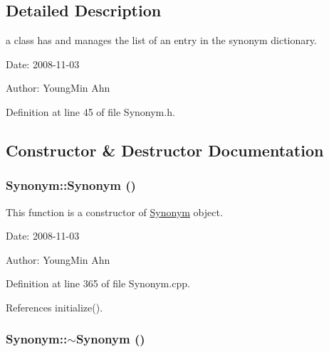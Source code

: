 \subsection{Detailed Description}
a class has and manages the list of an entry in the synonym dictionary. 

\begin{Desc}
\item[Date:]2008-11-03 \end{Desc}
\begin{Desc}
\item[Author:]YoungMin Ahn \end{Desc}


Definition at line 45 of file Synonym.h.

\subsection{Constructor \& Destructor Documentation}
\hypertarget{classkmaOrange_1_1Synonym_15f7de0140cea25ad188b3bc8e1dd093}{
\subsubsection[{Synonym}]{\setlength{\rightskip}{0pt plus 5cm}Synonym::Synonym ()}}
\label{classkmaOrange_1_1Synonym_15f7de0140cea25ad188b3bc8e1dd093}


This function is a constructor of \hyperlink{classkmaOrange_1_1Synonym}{Synonym} object. 

\begin{Desc}
\item[Date:]2008-11-03 \end{Desc}
\begin{Desc}
\item[Author:]YoungMin Ahn \end{Desc}


Definition at line 365 of file Synonym.cpp.

References initialize().\hypertarget{classkmaOrange_1_1Synonym_78c4aa5c70db24979a66dd607da2dd42}{
\subsubsection[{$\sim$Synonym}]{\setlength{\rightskip}{0pt plus 5cm}Synonym::$\sim$Synonym ()}}
\label{classkmaOrange_1_1Synonym_78c4aa5c70db24979a66dd607da2dd42}


